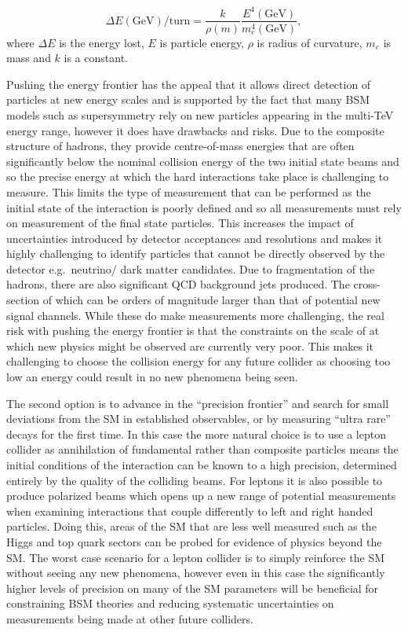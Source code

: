 \begin{equation}
\label{Eq:synchotron radiation}
\Delta E(\text{GeV})/\text{turn} = \frac{k}{\rho(m)}\frac{E^4(\text{GeV})}{m^4_e(\text{GeV})},
\end{equation}
where $\Delta E$ is the energy lost, $E$ is particle energy, $\rho$ is radius of curvature, $m_e$ is mass and $k$ is a constant\cite{PhysRev.65.343}.

Pushing the energy frontier has the appeal that it allows direct detection of particles at new energy scales and is supported by the fact that many \ac{BSM} models such as supersymmetry\cite{Baer:2012cf} rely on new particles appearing in the multi-TeV energy range, however it does have drawbacks and risks. Due to the composite structure of hadrons, they provide centre-of-mass energies that are often significantly below the nominal collision energy of the two initial state beams and so the precise energy at which the hard interactions take place is challenging to measure. This limits the type of measurement that can be performed as the initial state of the interaction is poorly defined and so all measurements must rely on measurement of the final state particles. This increases the impact of uncertainties introduced by detector acceptances and resolutions and makes it highly challenging to identify particles that cannot be directly observed by the detector e.g.\ neutrino/ dark matter candidates. Due to fragmentation of the hadrons, there are also significant \ac{QCD} background jets produced. The cross-section of which can be orders of magnitude larger than that of potential new signal channels. While these do make measurements more challenging, the real risk with pushing the energy frontier is that the constraints on the scale of at which new physics might be observed are currently very poor\cite{Dawson:2013bba}. This makes it challenging to choose the collision energy for any future collider as choosing too low an energy could result in no new phenomena being seen.

The second option is to advance in the ``precision frontier'' and search for small deviations from the \ac{SM} in established observables, or by measuring ``ultra rare'' decays for the first time\cite{Fujii:2015jha}. In this case the more natural choice is to use a lepton collider as annihilation of fundamental rather than composite particles means the initial conditions of the interaction can be known to a high precision, determined entirely by the quality of the colliding beams. For leptons it is also possible to produce polarized beams which opens up a new range of potential measurements when examining interactions that couple differently to left and right handed particles. Doing this, areas of the \ac{SM} that are less well measured such as the Higgs and top quark sectors can be probed for evidence of physics beyond the \ac{SM}. The worst case scenario for a lepton collider is to simply reinforce the \ac{SM} without seeing any new phenomena, however even in this case the significantly higher levels of precision on many of the \ac{SM} parameters will be beneficial for constraining \ac{BSM} theories and reducing systematic uncertainties on measurements being made at other future colliders.

